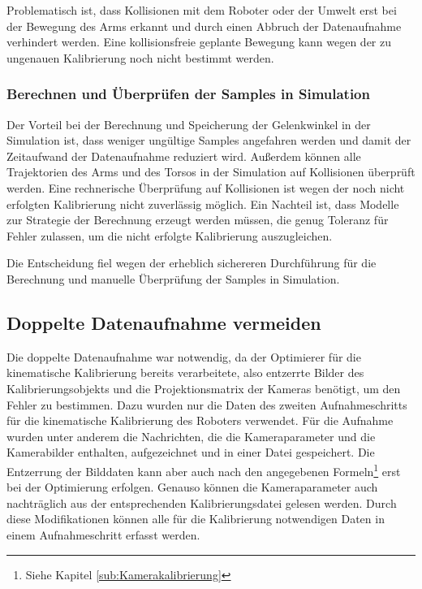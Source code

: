 Problematisch ist, dass Kollisionen mit dem Roboter oder der Umwelt erst bei
der Bewegung des Arms erkannt und durch einen Abbruch der Datenaufnahme 
verhindert werden. Eine kollisionsfreie geplante Bewegung kann wegen der zu 
ungenauen Kalibrierung noch nicht bestimmt werden.

\subsubsection{Berechnen und Überprüfen der Samples in Simulation}
\label{ssub:Berechnen und Überprüfen der Samples in Simulation}

Der Vorteil bei der Berechnung und Speicherung der
Gelenkwinkel in der Simulation ist, dass weniger ungültige Samples angefahren werden
und damit der Zeitaufwand der Datenaufnahme reduziert wird. Außerdem können alle
Trajektorien des Arms und des Torsos in der Simulation auf Kollisionen überprüft
werden. Eine rechnerische Überprüfung auf Kollisionen ist wegen der noch nicht 
erfolgten Kalibrierung nicht zuverlässig möglich. Ein Nachteil ist, dass
Modelle zur Strategie der Berechnung erzeugt werden müssen, die genug Toleranz für Fehler zulassen, um die 
nicht erfolgte Kalibrierung auszugleichen.

Die Entscheidung fiel wegen der erheblich sichereren Durchführung für die Berechnung
und manuelle Überprüfung der Samples in Simulation. 



\subsection{Doppelte Datenaufnahme vermeiden}
\label{sub:Doppelte Datenaufnahme vermeiden}

Die doppelte Datenaufnahme war notwendig, da der Optimierer für die kinematische
Kalibrierung bereits verarbeitete, also entzerrte Bilder des
Kalibrierungsobjekts und die Projektionsmatrix der Kameras benötigt, um den Fehler
zu bestimmen. Dazu wurden nur die Daten des zweiten Aufnahmeschritts für die 
kinematische Kalibrierung des Roboters verwendet. Für die Aufnahme wurden unter
anderem die Nachrichten, die die Kameraparameter und die Kamerabilder enthalten,
aufgezeichnet und in einer Datei gespeichert. Die Entzerrung der Bilddaten kann
aber auch nach den angegebenen Formeln\footnote{Siehe Kapitel \ref{sub:Kamerakalibrierung}} erst bei
der Optimierung erfolgen. Genauso können die Kameraparameter auch nachträglich
aus der entsprechenden Kalibrierungsdatei gelesen werden. Durch diese Modifikationen
können alle für die Kalibrierung notwendigen Daten in einem Aufnahmeschritt 
erfasst werden.

